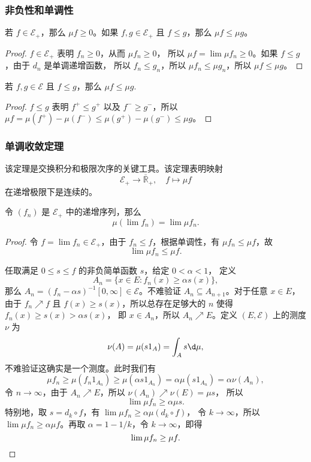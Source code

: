 \documentclass[fontset=none]{Notes}
\begin{document}
\subsubsection{非负性和单调性}

\begin{proposition}
  若 $f\in \mathcal{E}_+$，那么 $\mu f\geq 0$。如果 $f,g\in \mathcal{E}_+$
  且 $f\leq g$，那么 $\mu f\leq \mu g$。
\end{proposition}
\begin{proof}
  $f\in \mathcal{E}_+$ 表明 $f_n\geq 0$，从而 $\mu f_n\geq 0$，
  所以 $\mu f=\lim\mu f_n\geq 0$。如果 $f\leq g$，由于 $d_n$ 是单调递增函数，
  所以 $f_n\leq g_n$，所以 $\mu f_n\leq \mu g_n$，所以 $\mu f\leq \mu g$。
\end{proof}
\begin{corollary}
  若 $f,g\in \mathcal{E}$ 且 $f\leq g$，那么 $\mu f\leq \mu g$.
\end{corollary}
\begin{proof}
  $f\leq g$ 表明 $f^+\leq g^+$ 以及 $f^-\geq g^-$，所以
  $\mu f=\mu(f^+)-\mu(f^-)\leq \mu(g^+)-\mu (g^-)\leq \mu g$。
\end{proof}

\subsubsection{单调收敛定理}

该定理是交换积分和极限次序的关键工具。该定理表明映射
\[
  \mathcal{E}_+\to\bar{\mathbb{R}}_+,\quad f\mapsto \mu f  
\]
在递增极限下是连续的。

\begin{theorem}
  令 $(f_n)$ 是 $\mathcal{E}_+$ 中的递增序列，那么
  \[
    \mu(\lim f_n)=\lim\mu f_n.  
  \]
\end{theorem}
\begin{proof}
  令 $f=\lim f_n\in \mathcal{E}_+$，由于 $f_n\leq f$，根据单调性，有
  $\mu f_n\leq \mu f$，故
  \[
    \lim \mu f_n\leq \mu f.  
  \]

  任取满足 $0\leq s\leq f$ 的非负简单函数 $s$，给定 $0<\alpha <1$，
  定义
  \[
    A_n=\{x\in E:f_n(x)\geq \alpha s(x)\},
  \]
  那么 $A_n=(f_n-\alpha s)^{-1}[0,\infty]\in \mathcal{E}$。不难验证
  $A_n\subseteq A_{n+1}$。对于任意 $x\in E$，由于 $f_n\nearrow f$
  且 $f(x)\geq s(x)$，所以总存在足够大的 $n$ 使得 $f_n(x)\geq s(x)>\alpha s(x)$，
  即 $x\in A_n$，所以 $A_n\nearrow E$。定义 $(E,\mathcal{E})$ 上的测度
  $\nu$ 为
  \[
    \nu(A)=\mu(s1_A)=\int_A s\d \mu,  
  \]
  不难验证这确实是一个测度。此时我们有
  \[
    \mu f_n\geq \mu(f_n1_{A_n})\geq \mu(\alpha s1_{A_n})=\alpha\mu(s1_{A_n})
    =\alpha\nu(A_n),  
  \]
  令 $n\to\infty$，由于 $A_n\nearrow E$，所以 $\nu(A_n)\nearrow \nu(E)=\mu s$，
  所以
  \[
    \lim \mu f_n\geq \alpha\mu s.  
  \]
  特别地，取 $s=d_k\circ f$，有 $\lim \mu f_n\geq \alpha\mu(d_k\circ f)$，
  令 $k\to\infty$，所以 $\lim \mu f_n\geq \alpha\mu f$。再取
  $\alpha=1-1/k$，令 $k\to\infty$，即得
  \[
    \lim\mu f_n\geq \mu f.  \qedhere
  \]
\end{proof}
\end{document}
